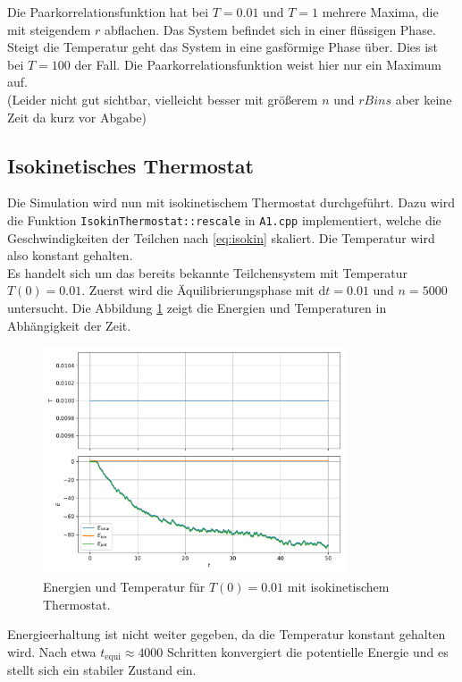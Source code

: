 Die Paarkorrelationsfunktion hat bei $T=0.01$ und $T=1$ mehrere Maxima, die mit steigendem $r$ abflachen.
Das System befindet sich in einer flüssigen Phase.
Steigt die Temperatur geht das System in eine gasförmige Phase über.
Dies ist bei $T=100$ der Fall.
Die Paarkorrelationsfunktion weist hier nur ein Maximum auf.
\\
(Leider nicht gut sichtbar, vielleicht besser mit größerem $n$ und $rBins$ aber keine Zeit da kurz vor Abgabe)

\FloatBarrier

\subsection{Isokinetisches Thermostat}
Die Simulation wird nun mit isokinetischem Thermostat durchgeführt.
Dazu wird die Funktion \texttt{IsokinThermostat::rescale} in \texttt{A1.cpp} implementiert, welche die Geschwindigkeiten der Teilchen nach \autoref{eq:isokin} skaliert.
Die Temperatur wird also konstant gehalten.
\\
Es handelt sich um das bereits bekannte Teilchensystem mit Temperatur $T(0)=0.01$.
Zuerst wird die Äquilibrierungsphase mit $\mathrm{d}t=0.01$ und $n=5000$ untersucht.
Die Abbildung \ref{fig:obs_001_iso} zeigt die Energien und Temperaturen in Abhängigkeit der Zeit.
\begin{figure}
    \centering
    \includegraphics[width=0.8\textwidth]{content/plots/obs_d)_T001_thermo.pdf}
    \caption{Energien und Temperatur für $T(0)=0.01$ mit isokinetischem Thermostat.}
    \label{fig:obs_001_iso}
\end{figure}
Energieerhaltung ist nicht weiter gegeben, da die Temperatur konstant gehalten wird.
Nach etwa $t_\text{equi} \approx 4000$ Schritten konvergiert die potentielle Energie und es stellt sich ein stabiler Zustand ein.
